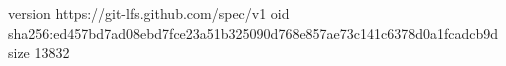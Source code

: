 version https://git-lfs.github.com/spec/v1
oid sha256:ed457bd7ad08ebd7fce23a51b325090d768e857ae73c141c6378d0a1fcadcb9d
size 13832
